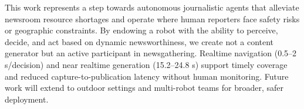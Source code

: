 \documentclass[letterpaper, 10 pt, conference]{ieeeconf}  %
\begin{document}
This work represents a step towards au\-ton\-omous jour\-nal\-is\-tic agents that alleviate newsroom resource shortages and operate where human reporters face safety risks or geographic constraints. By endowing a robot with the ability to perceive, decide, and act based on dynamic newsworthi\-ness, we create not a content generator but an active participant in newsgathering. Real\-time navigation (0.5–2 s/decision) and near real\-time generation (15.2–24.8 s) support timely coverage and reduced capture-to-publication latency without human monitoring. Future work will extend to outdoor settings and multi-robot teams for broader, safer deployment.



\end{document}
